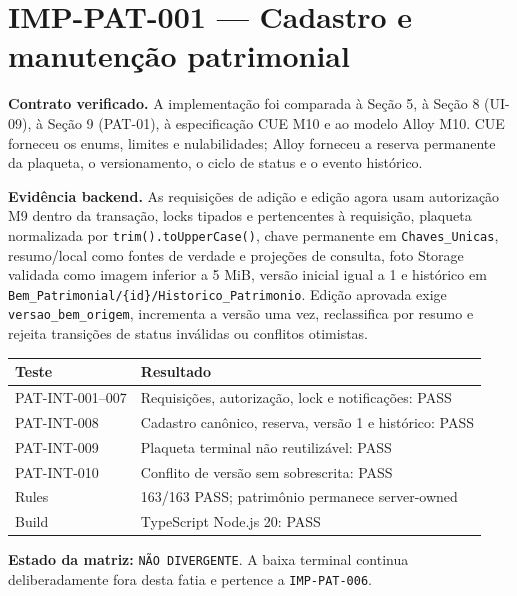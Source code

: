 \clearpage
\section{IMP-PAT-001 — Cadastro e manutenção patrimonial}

\textbf{Contrato verificado.} A implementação foi comparada à Seção 5, à
Seção 8 (UI-09), à Seção 9 (PAT-01), à especificação CUE M10 e ao modelo Alloy
M10. CUE forneceu os enums, limites e nulabilidades; Alloy forneceu a reserva
permanente da plaqueta, o versionamento, o ciclo de status e o evento histórico.

\textbf{Evidência backend.} As requisições de adição e edição agora usam
autorização M9 dentro da transação, locks tipados e pertencentes à requisição,
plaqueta normalizada por \texttt{trim().toUpperCase()}, chave permanente em
\texttt{Chaves\_Unicas}, resumo/local como fontes de verdade e projeções de
consulta, foto Storage validada como imagem inferior a 5 MiB, versão inicial
igual a 1 e histórico em
\texttt{Bem\_Patrimonial/\{id\}/Historico\_Patrimonio}. Edição aprovada exige
\texttt{versao\_bem\_origem}, incrementa a versão uma vez, reclassifica por
resumo e rejeita transições de status inválidas ou conflitos otimistas.

\begin{longtable}{p{}p{}}
\toprule
Teste & Resultado \\
\midrule
\endhead
PAT-INT-001--007 & Requisições, autorização, lock e notificações: PASS \\
PAT-INT-008 & Cadastro canônico, reserva, versão 1 e histórico: PASS \\
PAT-INT-009 & Plaqueta terminal não reutilizável: PASS \\
PAT-INT-010 & Conflito de versão sem sobrescrita: PASS \\
Rules & 163/163 PASS; patrimônio permanece server-owned \\
Build & TypeScript Node.js 20: PASS \\
\bottomrule
\end{longtable}

\textbf{Estado da matriz:} \texttt{NÃO DIVERGENTE}. A baixa terminal continua
deliberadamente fora desta fatia e pertence a \texttt{IMP-PAT-006}.
